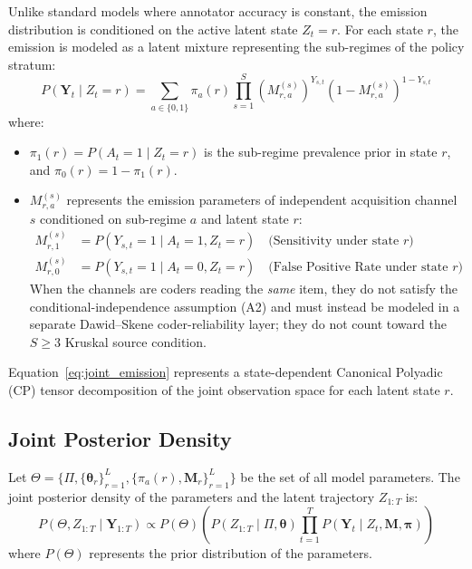 \documentclass[11pt,a4paper]{article}
\begin{document}
Unlike standard models where annotator accuracy is constant, the emission distribution is conditioned on the active latent state $Z_t = r$. For each state $r$, the emission is modeled as a latent mixture representing the sub-regimes of the policy stratum:
\begin{equation}\label{eq:joint_emission}
P(\mathbf{Y}_t \mid Z_t = r) = \sum_{a \in \{0, 1\}} \pi_a(r) \prod_{s=1}^S (M^{(s)}_{r, a})^{Y_{s,t}} (1 - M^{(s)}_{r, a})^{1 - Y_{s,t}}
\end{equation}
where:
\begin{itemize}
    \item $\pi_1(r) = P(A_t = 1 \mid Z_t = r)$ is the sub-regime prevalence prior in state $r$, and $\pi_0(r) = 1 - \pi_1(r)$.
    \item $M^{(s)}_{r, a}$ represents the emission parameters of independent acquisition channel $s$ conditioned on sub-regime $a$ and latent state $r$:
    \begin{align*}
        M^{(s)}_{r, 1} &= P(Y_{s,t} = 1 \mid A_t = 1, Z_t = r) \quad \text{(Sensitivity under state } r\text{)} \\
        M^{(s)}_{r, 0} &= P(Y_{s,t} = 1 \mid A_t = 0, Z_t = r) \quad \text{(False Positive Rate under state } r\text{)}
    \end{align*}
    When the channels are coders reading the \emph{same} item, they do not satisfy the conditional-independence assumption (A2) and must instead be modeled in a separate Dawid--Skene coder-reliability layer; they do not count toward the $S \ge 3$ Kruskal source condition. %
\end{itemize}
Equation~\eqref{eq:joint_emission} represents a state-dependent Canonical Polyadic (CP) tensor decomposition of the joint observation space for each latent state $r$.

\subsection{Joint Posterior Density}
Let $\Theta = \{\Pi, \{\boldsymbol{\theta}_r\}_{r=1}^L, \{\pi_a(r), \mathbf{M}_r\}_{r=1}^L\}$ be the set of all model parameters. The joint posterior density of the parameters and the latent trajectory $Z_{1:T}$ is:
\begin{equation}\label{eq:joint_posterior}
P(\Theta, Z_{1:T} \mid \mathbf{Y}_{1:T}) \propto P(\Theta) \left( P(Z_{1:T} \mid \Pi, \boldsymbol{\theta}) \prod_{t=1}^T P(\mathbf{Y}_t \mid Z_t, \mathbf{M}, \boldsymbol{\pi}) \right)
\end{equation}
where $P(\Theta)$ represents the prior distribution of the parameters.
\end{document}
